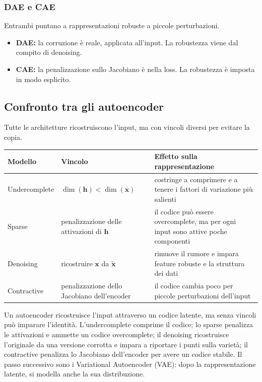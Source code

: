 \documentclass[11pt,a4paper]{article}
\begin{document}
\subsubsection{DAE e CAE}
Entrambi puntano a rappresentazioni robuste a piccole perturbazioni.
\begin{itemize}
  \item \textbf{DAE:} la corruzione è reale, applicata all'input. La
        robustezza viene dal compito di denoising.
  \item \textbf{CAE:} la penalizzazione sullo Jacobiano è nella loss. La
        robustezza è imposta in modo esplicito.
\end{itemize}

\subsection{Confronto tra gli autoencoder}

Tutte le architetture ricostruiscono l'input, ma con vincoli diversi per
evitare la copia.

\begin{center}
\renewcommand{\arraystretch}{1.35}
\begin{tabular}{|p{2.6cm}|p{4.6cm}|p{7.2cm}|}
\hline
\textbf{Modello} & \textbf{Vincolo} & \textbf{Effetto sulla rappresentazione} \\
\hline
Undercomplete & $\dim(\mathbf{h})<\dim(\mathbf{x})$
& costringe a comprimere e a tenere i fattori di variazione più salienti \\
\hline
Sparse & penalizzazione delle attivazioni di $\mathbf{h}$
& il codice può essere overcomplete, ma per ogni input sono attive poche
componenti \\
\hline
Denoising & ricostruire $\mathbf{x}$ da $\tilde{\mathbf{x}}$
& rimuove il rumore e impara feature robuste e la struttura dei dati \\
\hline
Contractive & penalizzazione dello Jacobiano dell'encoder
& il codice cambia poco per piccole perturbazioni dell'input \\
\hline
\end{tabular}
\end{center}

\begin{importante}
Un autoencoder ricostruisce l'input attraverso un codice latente, ma senza
vincoli può imparare l'identità. L'undercomplete comprime il codice; lo sparse
penalizza le attivazioni e ammette un codice overcomplete; il denoising
ricostruisce l'originale da una versione corrotta e impara a riportare i punti
sulla varietà; il contractive penalizza lo Jacobiano dell'encoder per avere un
codice stabile. Il passo successivo sono i Variational Autoencoder (VAE): dopo
la rappresentazione latente, si modella anche la sua distribuzione.
\end{importante}
\end{document}

